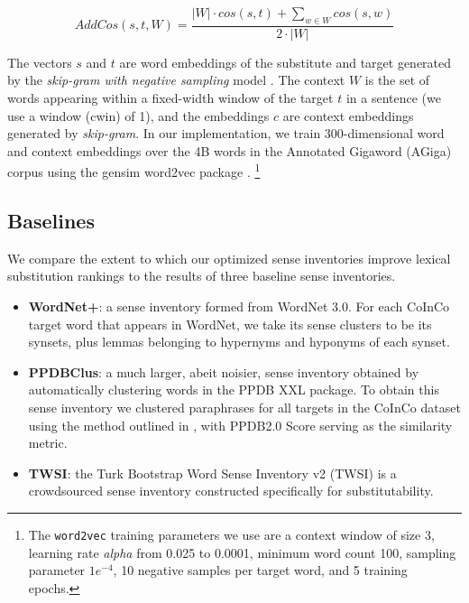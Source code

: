 \documentclass[11pt]{article}
\begin{document}
\begin{dmath}
	AddCos(s,t,W) = \frac{|W| \cdot cos(s,t) + \sum_{w \in W} cos(s,w)}{2 \cdot |W|}
\end{dmath}
	
\noindent The vectors $s$ and $t$ are word embeddings of the substitute and target generated by the \textit{skip-gram with negative sampling} model \cite{mikolov2013distributed,mikolov2013efficient}. The context $W$ is the set of words appearing within a fixed-width window of the target $t$ in a sentence (we use a window (cwin) of 1), and the embeddings $c$ are context embeddings generated by \textit{skip-gram}. In our implementation, we train 300-dimensional word and context embeddings over the 4B words in the Annotated Gigaword (AGiga) corpus \cite{napoles2012annotated} using the gensim word2vec package \cite{mikolov2013distributed,mikolov2013efficient,ismu:884893}. \footnote{The \texttt{word2vec} training parameters we use are a context window of size 3, learning rate \textit{alpha} from 0.025 to 0.0001, minimum word count 100, sampling parameter $1e^{-4}$, 10 negative samples per target word, and 5 training epochs.}

\subsection{Baselines}


We compare the extent to which our optimized sense inventories improve lexical substitution rankings to the results of three baseline sense inventories.

\begin{itemize}
\item\textbf{WordNet+}: a sense inventory formed from WordNet 3.0. For each CoInCo target word that appears in WordNet, we take its sense clusters to be its synsets, plus lemmas belonging to hypernyms and hyponyms of each synset. 
\item\textbf{PPDBClus}: a much larger, abeit noisier, sense inventory obtained by automatically clustering words in the PPDB XXL package. To obtain this sense inventory we clustered paraphrases for all targets in the CoInCo dataset using the method outlined in , with PPDB2.0 Score serving as the similarity metric.
\item\textbf{TWSI}: the Turk Bootstrap Word Sense Inventory v2 (TWSI) \cite{Biemann:2013} is a crowdsourced sense inventory constructed specifically for substitutability. 
\end{itemize}
\end{document}
